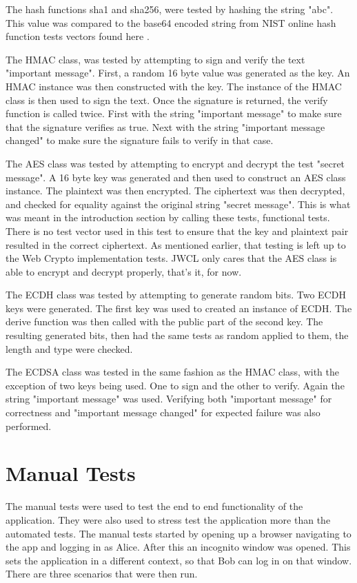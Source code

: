 The hash functions sha1 and sha256, were tested by hashing the string "abc". This value was compared to the base64 encoded string from NIST online hash function tests vectors found here \cite{test-vectors}.


The HMAC class, was tested by attempting to sign and verify the text "important message". First, a random 16 byte value was generated as the key. An HMAC instance was then constructed with the key. The instance of the HMAC class is then used to sign the text. Once the signature is returned, the verify function is called twice. First with the string "important message" to make sure that the signature verifies as true. Next with the string "important message changed" to make sure the signature fails to verify in that case.


The AES class was tested by attempting to encrypt and decrypt the test "secret message". A 16 byte key was generated and then used to construct an AES class instance. The plaintext was then encrypted. The ciphertext was then decrypted, and checked for equality against the original string "secret message". This is what was meant in the introduction section by calling these tests, functional tests. There is no test vector used in this test to ensure that the key and plaintext pair resulted in the correct ciphertext. As mentioned earlier, that testing is left up to the Web Crypto implementation tests. JWCL only cares that the AES class is able to encrypt and decrypt properly, that's it, for now.


The ECDH class was tested by attempting to generate random bits. Two ECDH keys were generated. The first key was used to created an instance of ECDH. The derive function was then called with the public part of the second key. The resulting generated bits, then had the same tests as random applied to them, the length and type were checked.


The ECDSA class was tested in the same fashion as the HMAC class, with the exception of two keys being used. One to sign and the other to verify. Again the string "important message" was used. Verifying both "important message" for correctness and "important message changed" for expected failure was also performed. 


\section{Manual Tests}


The manual tests were used to test the end to end functionality of the application. They were also used to stress test the application more than the automated tests. The manual tests started by opening up a browser navigating to the app and logging in as Alice. After this an incognito window was opened. This sets the application in a different context, so that Bob can log in on that window. There are three scenarios that were then run.


